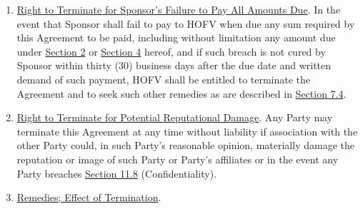 \documentclass[]{article}
\begin{document}
\begin{enumerate}
\def\labelenumi{\arabic{enumi}.}
\setcounter{enumi}{1}
\item
  \uline{Right to Terminate for Sponsor's Failure to Pay All Amounts
  Due}. In the event that Sponsor shall fail to pay to HOFV when due any
  sum required by this Agreement to be paid, including without
  limitation any amount due under \uline{Section 2} or \uline{Section 4}
  hereof, and if such breach is not cured by Sponsor within thirty (30)
  business days after the due date and written demand of such payment,
  HOFV shall be entitled to terminate the Agreement and to seek such
  other remedies as are described in \uline{Section 7.4}.
\item
  \uline{Right to Terminate for Potential Reputational Damage}. Any
  Party may terminate this Agreement at any time without liability if
  association with the other Party could, in such Party's reasonable
  opinion, materially damage the reputation or image of such Party or
  Party's affiliates or in the event any Party breaches \uline{Section
  11.8} (Confidentiality).
\item
  \uline{Remedies; Effect of Termination}.


\end{enumerate}
\end{document}
